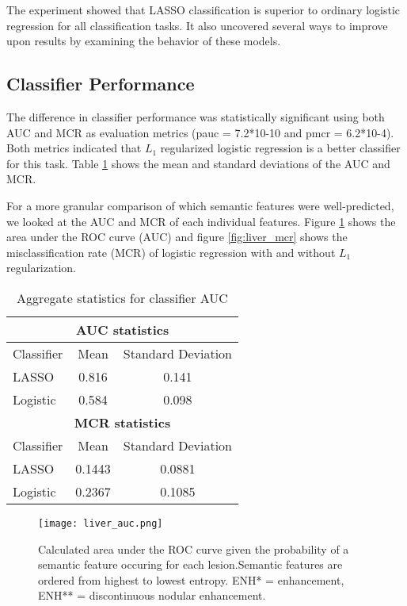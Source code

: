 The experiment showed that LASSO classification is superior to ordinary logistic regression for all classification tasks.
It also uncovered several ways to improve upon results by examining the behavior of these models.

\subsection{Classifier Performance}
The difference in classifier performance was statistically significant using both AUC and MCR as evaluation metrics (pauc = 7.2*10-10 and pmcr = 6.2*10-4).
Both metrics indicated that $L_1$ regularized logistic regression is a better classifier for this task.
Table \ref{table:liver_auc_mcr} shows the mean and standard deviations of the AUC and MCR.

For a more granular comparison of which semantic features were well-predicted, we looked at the AUC and MCR of each individual features.
Figure \ref{fig:liver_auc} shows the area under the ROC curve (AUC) and figure \ref{fig:liver_mcr} shows the misclassification rate (MCR) of logistic regression with and without $L_1$ regularization.

\begin{table}[h!]
	\centering
	\begin{tabular}{|l|c|c|}
		\hline
		\multicolumn{3}{|c|}{\textbf{AUC statistics}} \\ \hline
		Classifier & Mean & Standard Deviation\\ 
		\hline
		LASSO & 0.816 & 0.141 \\ 
		\hline 
		Logistic & 0.584 & 0.098 \\ 
		\hline \hline
		\multicolumn{3}{|c|}{\textbf{MCR statistics} }\\ 
		\hline
		Classifier & Mean & Standard Deviation\\ 
		\hline
		LASSO & 0.1443 & 0.0881 \\ 
		\hline 
		Logistic & 0.2367 & 0.1085 \\ 
		\hline 
	\end{tabular}
	\caption{Aggregate statistics for classifier AUC}
	\label{table:liver_auc_mcr}
\end{table}


\begin{figure}
	\centering
	\texttt{[image: liver\_auc.png]}
	\caption[AUC results for liver annotation]{Calculated area under the ROC curve given the probability of a semantic feature occuring for each lesion.Semantic features are ordered from highest to lowest entropy. ENH* = enhancement, ENH** = discontinuous nodular enhancement.}
	\label{fig:liver_auc}
\end{figure}


